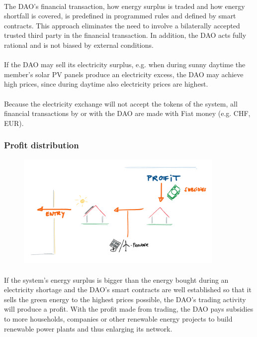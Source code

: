 \documentclass{scrartcl}
\begin{document}
	\paragraph{}
	The DAO's financial transaction, how energy surplus is traded and how energy shortfall is covered, is predefined in programmed rules and defined by smart contracts. This approach eliminates the need to involve a bilaterally accepted trusted third party in the financial transaction. In addition, the DAO acts fully rational and is not biased by external conditions.
	
	\paragraph{}
	If the DAO may sell its electricity surplus, e.g. when during sunny daytime the member's solar PV panels produce an electricity excess, the DAO may achieve high prices, since during daytime also electricity prices are highest.
	
	\paragraph{}
	Because the electricity exchange will not accept the tokens of the system, all financial transactions by or with the DAO are made with Fiat money (e.g. CHF, EUR).
	
	\subsubsection{Profit distribution}
	
	\begin{figure} [h]
		\centering
		\includegraphics[width=100mm,scale=0.5]{section_3_3_3.png}
	\end{figure}
	
	\paragraph{}
	If the system's energy surplus is bigger than the energy bought during an electricity shortage and the DAO's smart contracts are well established so that it sells the green energy to the highest prices possible, the DAO's trading activity will produce a profit. With the profit made from trading, the DAO pays subsidies to more households, companies or other renewable energy projects to build renewable power plants and thus enlarging its network.
	
\end{document}
